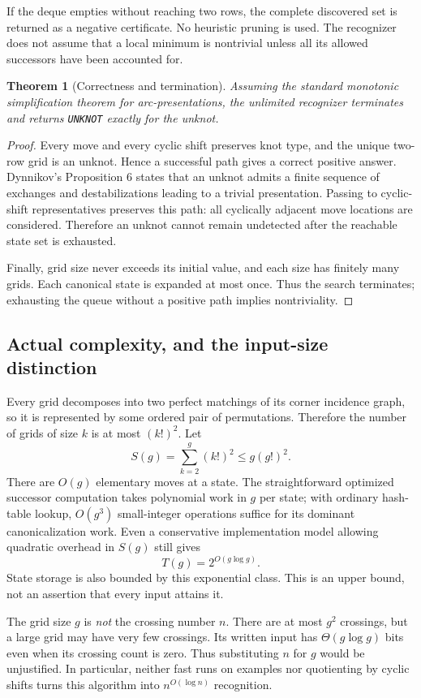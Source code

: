 \documentclass[11pt]{article}
\newtheorem{theorem}{Theorem}[section]
\newcommand{\code}[1]{\texttt{#1}}
\begin{document}
If the deque empties without reaching two rows, the complete discovered set
is returned as a negative certificate. No heuristic pruning is used. The
recognizer does not assume that a local minimum is nontrivial unless all its
allowed successors have been accounted for.

\begin{theorem}[Correctness and termination]
Assuming the standard monotonic simplification theorem for arc-presentations,
the unlimited recognizer terminates and returns \code{UNKNOT} exactly for the
unknot.
\end{theorem}
\begin{proof}
Every move and every cyclic shift preserves knot type, and the unique two-row
grid is an unknot. Hence a successful path gives a correct positive answer.
Dynnikov's Proposition 6 \cite{dynnikov} states that an unknot admits a finite
sequence of exchanges and destabilizations leading to a trivial presentation.
Passing to cyclic-shift representatives preserves this path: all cyclically
adjacent move locations are considered. Therefore an unknot cannot remain
undetected after the reachable state set is exhausted.

Finally, grid size never exceeds its initial value, and each size has finitely
many grids. Each canonical state is expanded at most once. Thus the search
terminates; exhausting the queue without a positive path implies nontriviality.
\end{proof}

\subsection{Actual complexity, and the input-size distinction}
Every grid decomposes into two perfect matchings of its corner incidence graph,
so it is represented by some ordered pair of permutations. Therefore the number
of grids of size $k$ is at most $(k!)^2$. Let
\[
 S(g)=\sum_{k=2}^{g}(k!)^2\leq g(g!)^2.
\]
There are $O(g)$ elementary moves at a state. The straightforward optimized
successor computation takes polynomial work in $g$ per state; with ordinary
hash-table lookup, $O(g^3)$ small-integer operations suffice for its dominant
canonicalization work. Even a conservative implementation model allowing
quadratic overhead in $S(g)$ still gives
\[
 T(g)=2^{O(g\log g)}.
\]
State storage is also bounded by this exponential class. This is an upper
bound, not an assertion that every input attains it.

The grid size $g$ is \emph{not} the crossing number $n$. There are at most $g^2$
crossings, but a large grid may have very few crossings. Its written input has
$\Theta(g\log g)$ bits even when its crossing count is zero. Thus substituting
$n$ for $g$ would be unjustified. In particular, neither fast runs on examples
nor quotienting by cyclic shifts turns this algorithm into
$n^{O(\log n)}$ recognition.
\end{document}
